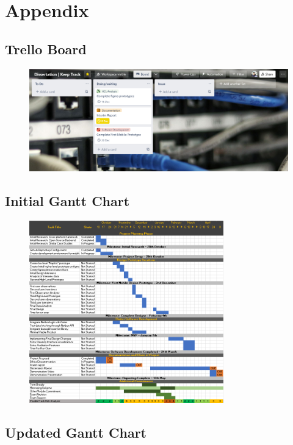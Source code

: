 \documentclass [11pt,a4paper]{article}
\begin{document}

 

\appendix
\section{Appendix}
\label{sec:appendix}
\subsection{Trello Board}
\label{sec:trello_board}
\begin{figure}[H]
    \centering
    \includegraphics[width=.75\textwidth]{images/trello-board.png}
\end{figure}   

\subsection{Initial Gantt Chart}
\label{sec:init_gantt_charts}
\begin{figure}[H]
    \centering
    \includegraphics[width=0.75\textwidth]{images/keeptrack-gantt-initial.png}
    \label{fig:initialworkplan}
\end{figure}

\subsection{Updated Gantt Chart}
\label{sec:updated_gantt_charts}
\end{document}
